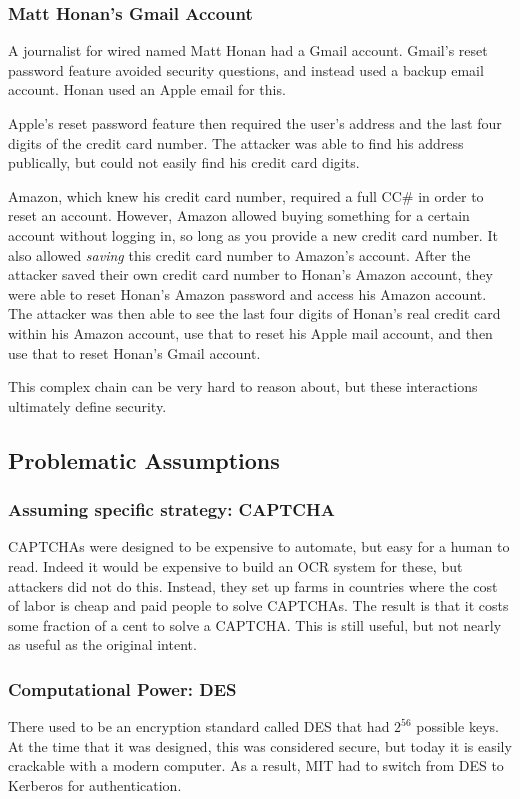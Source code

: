 \subsubsection{Matt Honan's Gmail Account}
A journalist for wired named Matt Honan had a Gmail account. Gmail's reset password feature avoided security questions, and instead used a backup email account. Honan used an Apple email for this.

Apple's reset password feature then required the user's address and the last four digits of the credit card number. The attacker was able to find his address publically, but could not easily find his credit card digits.

Amazon, which knew his credit card number, required a full CC\# in order to reset an account. However, Amazon allowed buying something for a certain account without logging in, so long as you provide a new credit card number. It also allowed \textit{saving} this credit card number to Amazon's account. After the attacker saved their own credit card number to Honan's Amazon account, they were able to reset Honan's Amazon password and access his Amazon account. The attacker was then able to see the last four digits of Honan's real credit card within his Amazon account, use that to reset his Apple mail account, and then use that to reset Honan's Gmail account.

This complex chain can be very hard to reason about, but these interactions ultimately define security.

\subsection{Problematic Assumptions}
\subsubsection{Assuming specific strategy: CAPTCHA}
CAPTCHAs were designed to be expensive to automate, but easy for a human to read. Indeed it would be expensive to build an OCR system for these, but attackers did not do this. Instead, they set up farms in countries where the cost of labor is cheap and paid people to solve CAPTCHAs. The result is that it costs some fraction of a cent to solve a CAPTCHA. This is still useful, but not nearly as useful as the original intent.

\subsubsection{Computational Power: DES}
There used to be an encryption standard called DES that had $2^{56}$ possible keys. At the time that it was designed, this was considered secure, but today it is easily crackable with a modern computer. As a result, MIT had to switch from DES to Kerberos for authentication.


